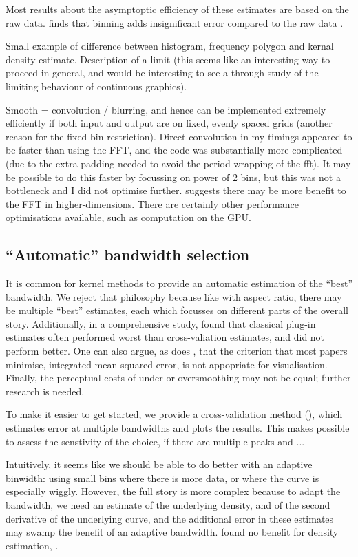 \documentclass[journal]{vgtc}                %
\begin{document}
Most results about the asymptoptic efficiency of these estimates are based on the raw data. \citet{wand:1994} finds that binning adds insignificant error compared to the raw data .

Small example of difference between histogram, frequency polygon and kernal density estimate.  Description of a limit (this seems like an interesting way to proceed in general, and would be interesting to see a through study of the limiting behaviour of continuous graphics).


Smooth = convolution / blurring, and hence can be implemented extremely efficiently if both input and output are on fixed, evenly spaced grids (another reason for the fixed bin restriction). Direct convolution in my timings appeared to be faster than using the FFT, and the code was substantially more complicated (due to the extra padding needed to avoid the period wrapping of the fft).  It may be possible to do this faster by focussing on power of 2 bins, but this was not a bottleneck and I did not optimise further. \citep{wand:1994} suggests there may be more benefit to the FFT in higher-dimensions. There are certainly other performance optimisations available, such as computation on the GPU.


\subsection{``Automatic'' bandwidth selection}

It is common for kernel methods to provide an automatic estimation of the ``best'' bandwidth. We reject that philosophy because like with aspect ratio, there may be multiple ``best'' estimates, each which focusses on different parts of the overall story. Additionally, in a comprehensive study, \citet{loader:1999} found that classical plug-in estimates often performed worst than cross-valiation estimates, and did not perform better. One can also argue, as does \citep{denby:2009}, that the criterion that most papers minimise, integrated mean squared error, is not appopriate for visualisation. Finally, the perceptual costs of under or oversmoothing may not be equal; further research is needed.

To make it easier to get started, we provide a cross-validation method (\citep{efron:1983}), which estimates error at multiple bandwidths and plots the results.  This makes possible to assess the senstivity of the choice, if there are multiple peaks and ...

Intuitively, it seems like we should be able to do better with an adaptive binwidth: using small bins where there is more data, or where the curve is especially wiggly. However, the full story is more complex because to adapt the bandwidth, we need an estimate of the underlying density, and of the second derivative of the underlying curve, and the additional error in these estimates may swamp the benefit of an adaptive bandwidth. \citet{terrell:1992} found no benefit for density estimation, \citep{fan:1992,brockmann:1993,schucany:1995,herrmann:1997}.
\end{document}
